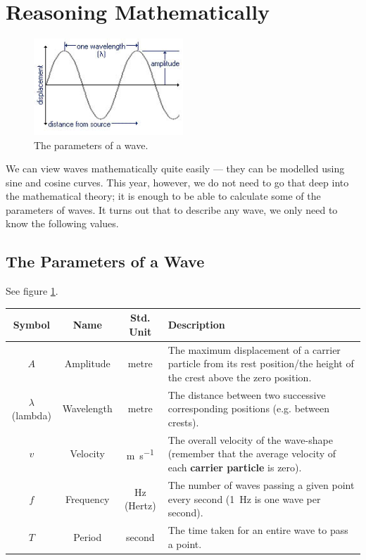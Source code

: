 \documentclass[a4paper]{amsbook}
\newcommand\capcite[1]{}
\begin{document}
\section{Reasoning Mathematically}
\begin{figure}
  \centering
  \includegraphics[width=0.5\textwidth]{sinewave}
  \caption{The parameters of a wave. \capcite{http://astro.uchicago.edu/cara/outreach/se/ysi/1999/diagram.jpg}\label{fig:sinewave}}
\end{figure}
We can view waves mathematically quite easily --- they can be modelled using sine and cosine curves. This year, however, we do not need
to go that deep into the mathematical theory; it is enough to be able to calculate some of the parameters of waves. It turns out that
to describe any wave, we only need to know the following values.

\subsection{The Parameters of a Wave}
See figure \ref{fig:sinewave}.
\begin{center}
\begin{tabularx}{\linewidth}{c|c|c|X}
  \textbf{Symbol} & \textbf{Name} & \textbf{Std. Unit} & \textbf{Description}\\\hline
  $ A $ & Amplitude & metre & The maximum displacement of a carrier particle from its rest position/the height of the crest above the zero position.\\
  $ \lambda $ (lambda) & Wavelength & metre & The distance between two successive corresponding positions (e.g. between crests).\\
  $ v $ & Velocity & \si{\metre\per\second} & The overall velocity of the wave-shape (remember that the average velocity of
                                              each \textbf{carrier particle} is zero).\\
  $ f $ & Frequency & \si{\hertz} (Hertz) & The number of waves passing a given point every second (\SI{1}{\hertz} is one wave per second).\\
  $ T $ & Period & second & The time taken for an entire wave to pass a point.
\end{tabularx}
\end{center}
\end{document}
